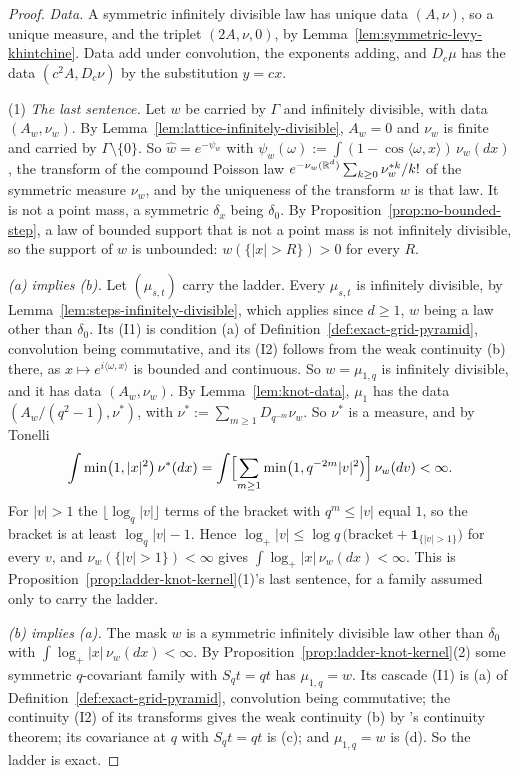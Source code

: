 \begin{proof}
\emph{Data.} A symmetric infinitely divisible law has unique \Levy{} data $(A, \nu)$, so a unique
\Levy{} measure, and the triplet $(2A, \nu, 0)$, by Lemma~\ref{lem:symmetric-levy-khintchine}.
Data add under convolution, the exponents adding, and $D_c\mu$ has the data $(c^2A, D_c\nu)$ by the
substitution $y = cx$.

(1) \emph{The last sentence.} Let $w$ be carried by $\Gamma$ and infinitely divisible, with data
$(A_w, \nu_w)$. By
Lemma~\ref{lem:lattice-infinitely-divisible}, $A_w = 0$ and $\nu_w$ is finite and carried by
$\Gamma \setminus \{0\}$. So $\widehat w = e^{-\psi_w}$ with $\psi_w(\omega) := \int(1 -
\cos\langle\omega, x\rangle)\,\nu_w(dx)$, the transform of the compound Poisson law
$e^{-\nu_w(\mathbb{R}^d)}\sum_{k \ge 0}\nu_w^{*k}/k!$ of the symmetric measure $\nu_w$, and by the uniqueness
of the transform $w$ is that law. It is not a point mass, a symmetric $\delta_x$ being $\delta_0$.
By Proposition~\ref{prop:no-bounded-step}, a law of bounded support that is not a point mass is not
infinitely divisible, so the support of $w$ is unbounded: $w(\{|x| > R\}) > 0$ for every $R$.

\emph{(a) implies (b).} Let $(\mu_{s,t})$ carry the ladder. Every $\mu_{s,t}$ is infinitely
divisible, by Lemma~\ref{lem:steps-infinitely-divisible}, which applies since $d \ge 1$, $w$ being
a law other than $\delta_0$. Its (I1) is condition (a) of Definition~\ref{def:exact-grid-pyramid},
convolution being commutative, and its (I2) follows from the weak continuity (b) there, as
$x \mapsto e^{i\langle\omega, x\rangle}$ is bounded and continuous. So $w = \mu_{1,q}$ is
infinitely divisible, and it has data $(A_w, \nu_w)$. By Lemma~\ref{lem:knot-data}, $\mu_1$ has the
data $(A_w/(q^2 - 1), \nu^*)$, with $\nu^* := \sum_{m \ge 1}D_{q^{-m}}\nu_w$. So $\nu^*$ is a
\Levy{} measure, and by Tonelli
\[
\int\min\bigl(1, |x|^2\bigr)\,\nu^*(dx) = \int\Bigl[\sum_{m \ge 1}\min\bigl(1,
q^{-2m}|v|^2\bigr)\Bigr]\,\nu_w(dv) < \infty .
\]
For $|v| > 1$ the $\lfloor\log_q|v|\rfloor$ terms of the bracket with $q^m \le |v|$ equal $1$, so
the bracket is at least $\log_q|v| - 1$. Hence
$\log_+|v| \le \log q\,\bigl(\text{bracket} + \mathbf 1_{\{|v| > 1\}}\bigr)$ for every $v$, and
$\nu_w(\{|v| > 1\}) < \infty$ gives $\int\log_+|x|\,\nu_w(dx) < \infty$. This is
Proposition~\ref{prop:ladder-knot-kernel}(1)'s last sentence, for a family assumed only to carry
the ladder.

\emph{(b) implies (a).} The mask $w$ is a symmetric infinitely divisible law other than $\delta_0$
with $\int\log_+|x|\,\nu_w(dx) < \infty$. By Proposition~\ref{prop:ladder-knot-kernel}(2) some
symmetric $q$-covariant family with $S_qt = qt$ has $\mu_{1,q} = w$. Its cascade (I1) is (a) of
Definition~\ref{def:exact-grid-pyramid}, convolution being commutative; the continuity (I2) of its
transforms gives the weak continuity (b) by \Levy's continuity theorem; its covariance at $q$ with
$S_qt = qt$ is (c); and $\mu_{1,q} = w$ is (d). So the ladder is exact.


\end{proof}
